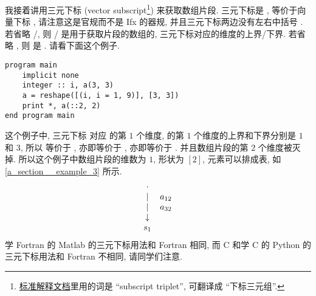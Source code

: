 我接着讲用三元下标 (vector subscript\footnote{\href{https://j3-fortran.org/doc/year/24/24-007.pdf}{标准解释文档}里用的词是 ``subscript triplet'', 可翻译成 ``下标三元组''.}) 来获取数组片段. 三元下标是 , 等价于向量下标 \ttt{[(i, i = m1, m2, m3)]}, 请注意这是官规而不是 Ifx 的器规, 并且三元下标两边没有左右中括号 \ttt{[]}. 若省略 /, 则 / 是用于获取片段的数组的, 三元下标对应的维度的上界/下界. 若省略 , 则  是 . 请看下面这个例子.
\begin{lstlisting}
program main
    implicit none
    integer :: i, a(3, 3)
    a = reshape([(i, i = 1, 9)], [3, 3])
    print *, a(::2, 2)
end program main
\end{lstlisting}
这个例子中, 三元下标  对应  的第 $1$ 个维度,  的第 $1$ 个维度的上界和下界分别是 $1$ 和 $3$, 所以  等价于 , 亦即等价于 \ttt{[(i, i = 1, 3, 2)]}, 亦即等价于 \ttt{[1, 3]}. 并且数组片段的第 $2$ 个维度被灭掉. 所以这个例子中数组片段的维数为 $1$, 形状为 $[2]$, 元素可以排成表, 如 \eqref{a_section__example_3} 所示.
\begin{equation}
    \begin{matrix}
        \cdot&\\
        |&a_{12}\\
        |&a_{32}\\
        \downarrow&\\
        s_1&
    \end{matrix}\label{a_section__example_3}
\end{equation}
学 Fortran 的 Matlab 的三元下标用法和 Fortran 相同, 而 C 和学 C 的 Python 的三元下标用法和 Fortran 不相同, 请同学们注意.

